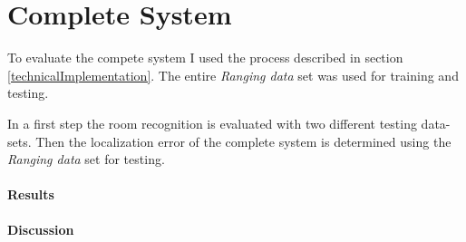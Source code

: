 \section{Complete System}

To evaluate the compete system I used the process described in section \ref{technicalImplementation}. The entire \emph{Ranging data} set was used for training and testing.

In a first step the room recognition is evaluated with two different testing data-sets. Then the localization error of the complete system is determined using the \emph{Ranging data} set for testing.

\paragraph{Results}


\paragraph{Discussion}

